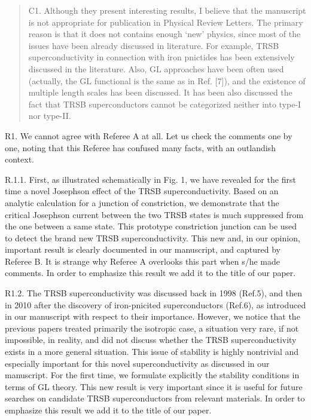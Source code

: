\documentclass[11pt]{article}
\begin{document}
\begin{quote}
C1. Although they present interesting results, I believe that the
manuscript is not appropriate for publication in Physical Review
Letters. The primary reason is that it does not contains enough `new'
physics, since most of the issues have been already discussed in
literature. For example, TRSB superconductivity in connection with iron
pnictides has been extensively discussed in the literature. Also, GL
approaches have been often used (actually, the GL functional is the same
as in Ref. {[}7{]}), and the existence of multiple length scales has
been discussed. It has been also discussed the fact that TRSB
superconductors cannot be categorized neither into type-I nor type-II.
\end{quote}

R1. We cannot agree with Referee A at all. Let us check the comments one
by one, noting that this Referee has confused many facts, with an
outlandish context.

R.1.1. First, as illustrated schematically in Fig. 1, we have revealed
for the first time a novel Josephson effect of the TRSB
superconductivity. Based on an analytic calculation for a junction of
constriction, we demonstrate that the critical Josephson current between
the two TRSB states is much suppressed from the one between a same
state. This prototype constriction junction can be used to detect the
brand new TRSB superconductivity. This new and, in our opinion,
important result is clearly documented in our manuscript, and captured
by Referee B. It is strange why Referee A overlooks this part when s/he
made comments. In order to emphasize this result we add it to the title
of our paper.

R1.2. The TRSB superconductivity was discussed back in 1998 (Ref.5), and
then in 2010 after the discovery of iron-pnicited superconductors
(Ref.6), as introduced in our manuscript with respect to their
importance. However, we notice that the previous papers treated
primarily the isotropic case, a situation very rare, if not impossible,
in reality, and did not discuss whether the TRSB superconductivity
exists in a more general situation. This issue of stability is highly
nontrivial and especially important for this novel superconductivity as
discussed in our manuscript. For the first time, we formulate explicitly
the stability conditions in terms of GL theory. This new result is very
important since it is useful for future searches on candidate TRSB
superconductors from relevant materials. In order to emphasize this
result we add it to the title of our paper.
\end{document}
